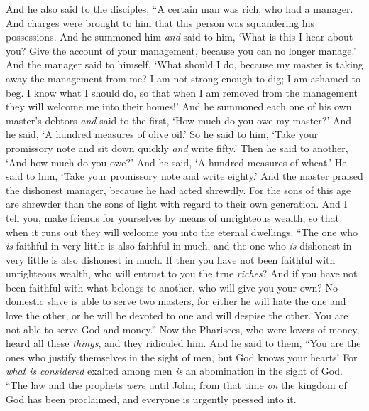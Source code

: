 \begin{biblechapter} %
 And he also said to the disciples, “A certain man was rich, who had a manager. And charges were brought to him that this person was squandering his possessions.
\verse And he summoned him \textit{and} said to him, ‘What is this I hear about you? Give the account of your management, because you can no longer manage.’
\verse And the manager said to himself, ‘What should I do, because my master is taking away the management from me? I am not strong enough to dig; I am ashamed to beg.
\verse I know what I should do, so that when I am removed from the management they will welcome me into their homes!’
\verse And he summoned each one of his own master’s debtors \textit{and} said to the first, ‘How much do you owe my master?’
\verse And he said, ‘A hundred measures of olive oil.’ So he said to him, ‘Take your promissory note and sit down quickly \textit{and} write fifty.’
\verse Then he said to another, ‘And how much do you owe?’ And he said, ‘A hundred measures of wheat.’ He said to him, ‘Take your promissory note and write eighty.’
\verse And the master praised the dishonest manager, because he had acted shrewdly. For the sons of this age are shrewder than the sons of light with regard to their own generation.
\verse And I tell you, make friends for yourselves by means of unrighteous wealth, so that when it runs out they will welcome you into the eternal dwellings.
\verse “The one who \textit{is} faithful in very little is also faithful in much, and the one who \textit{is} dishonest in very little is also dishonest in much.
\verse If then you have not been faithful with unrighteous wealth, who will entrust to you the true \textit{riches}?
\verse And if you have not been faithful with what belongs to another, who will give you your own?
\verse No domestic slave is able to serve two masters, for either he will hate the one and love the other, or he will be devoted to one and will despise the other. You are not able to serve God and money.”
 Now the Pharisees, who were lovers of money, heard all these \textit{things}, and they ridiculed him.
\verse And he said to them, “You are the ones who justify themselves in the sight of men, but God knows your hearts! For \textit{what is} \textit{considered} exalted among men \textit{is} an abomination in the sight of God.
\verse “The law and the prophets \textit{were} until John; from that time \textit{on} the kingdom of God has been proclaimed, and everyone is urgently pressed into it.

\end{biblechapter}

